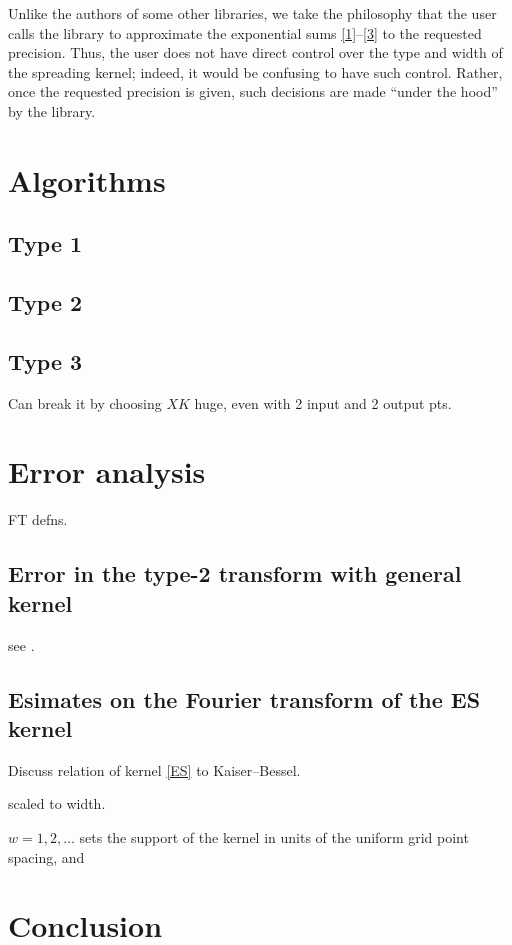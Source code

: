 \documentclass[10pt]{article}
\newcommand{\KB}{Kaiser--Bessel}
\begin{document}
Unlike the authors of some other libraries,
we take the philosophy that the user calls the library to approximate the
exponential sums \eqref{1}--\eqref{3} to the requested precision.
Thus, the user does not have direct control over the type and width of
the spreading kernel; indeed, it would be confusing to have such control.
Rather, once the requested precision is given, such decisions
are made ``under the hood'' by the library.


\section{Algorithms}

\subsection{Type 1}

\subsection{Type 2}


\subsection{Type 3}

Can break it by choosing $XK$ huge, even with 2 input and 2 output pts.




\section{Error analysis}

FT defns.

\subsection{Error in the type-2 transform with general kernel}

see \cite[Sec.~V.B]{fessler}.




\subsection{Esimates on the Fourier transform of the ES kernel}

Discuss relation of kernel \eqref{ES} to \KB.





scaled to width.

$w=1,2,\ldots$
sets the support of the kernel in units of the uniform grid point spacing, and





\section{Conclusion}




\end{document}
